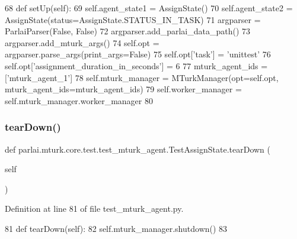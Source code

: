 \begin{DoxyCode}
68     \textcolor{keyword}{def }setUp(self):
69         self.agent\_state1 = AssignState()
70         self.agent\_state2 = AssignState(status=AssignState.STATUS\_IN\_TASK)
71         argparser = ParlaiParser(\textcolor{keyword}{False}, \textcolor{keyword}{False})
72         argparser.add\_parlai\_data\_path()
73         argparser.add\_mturk\_args()
74         self.opt = argparser.parse\_args(print\_args=\textcolor{keyword}{False})
75         self.opt[\textcolor{stringliteral}{'task'}] = \textcolor{stringliteral}{'unittest'}
76         self.opt[\textcolor{stringliteral}{'assignment\_duration\_in\_seconds'}] = 6
77         mturk\_agent\_ids = [\textcolor{stringliteral}{'mturk\_agent\_1'}]
78         self.mturk\_manager = MTurkManager(opt=self.opt, mturk\_agent\_ids=mturk\_agent\_ids)
79         self.worker\_manager = self.mturk\_manager.worker\_manager
80 
\end{DoxyCode}
\mbox{\label{classparlai_1_1mturk_1_1core_1_1test_1_1test__mturk__agent_1_1TestAssignState_aa09fcbe7ae3c90559b032d3fdd79969e}} 
\subsubsection{\texorpdfstring{tear\+Down()}{tearDown()}}
{\footnotesize\ttfamily def parlai.\+mturk.\+core.\+test.\+test\+\_\+mturk\+\_\+agent.\+Test\+Assign\+State.\+tear\+Down (\begin{DoxyParamCaption}\item[{}]{self }\end{DoxyParamCaption})}



Definition at line 81 of file test\+\_\+mturk\+\_\+agent.\+py.


\begin{DoxyCode}
81     \textcolor{keyword}{def }tearDown(self):
82         self.mturk\_manager.shutdown()
83 
\end{DoxyCode}
\mbox{\label{classparlai_1_1mturk_1_1core_1_1test_1_1test__mturk__agent_1_1TestAssignState_af5803e89246df5c970afae9e01835e8a}} 
